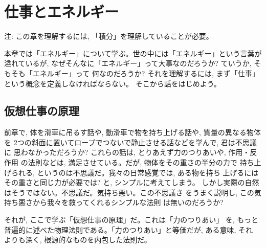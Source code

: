 \chapter{仕事とエネルギー}

{\small 注: この章を理解するには, 「積分」を理解していることが必要。}

本章では「エネルギー」について学ぶ。世の中には「エネルギー」という言葉が溢れているが, 
なぜそんなに「エネルギー」って大事なのだろうか? ていうか, そもそも「エネルギー」って
何なのだろうか? それを理解するには, まず「仕事」という概念を定義しなければならない。
そこから話をはじめよう。\\

\section{仮想仕事の原理}

前章で, 体を滑車に吊るす話や, 動滑車で物を持ち上げる話や, 質量の異なる物体を
2つの斜面に置いてロープでつないで静止させる話などを学んで, 君は不思議に
思わなかっただろうか? これらの話は, とりあえず力のつりあいや, 作用・反作用
の法則などは, 満足させている。だが, 物体をその重さの半分の力で
持ち上げられる, というのは不思議だ。我々の日常感覚では, ある物を持ち
上げるにはその重さと同じ力が必要では? と, シンプルに考えてしまう。
しかし実際の自然はそうではない。不思議だ。気持ち悪い。この不思議さ
をうまく説明し, この気持ち悪さから我々を救ってくれるシンプルな法則
は無いのだろうか? 

それが, ここで学ぶ「仮想仕事の原理」だ。これは「力のつりあい」
を, もっと普遍的に述べた物理法則である。「力のつりあい」と等価だが, ある意味, それ
よりも深く, 根源的なものを内包した法則だ。

